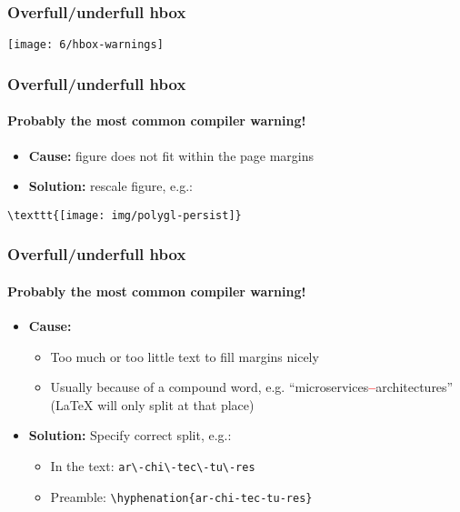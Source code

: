 \documentclass[aspectratio=169]{beamer}
\begin{document}
\begin{frame}
  \frametitle{Overfull/underfull hbox}

  \texttt{[image: 6/hbox-warnings]}

\end{frame}

\begin{frame}[fragile]
  \frametitle{Overfull/underfull hbox}
  \framesubtitle{Probably the most common compiler warning!}

  \begin{itemize}
    \item \textbf{Cause:} figure does not fit within the page margins
    \item \textbf{Solution:} rescale figure, e.g.:
  \end{itemize}

\begin{verbatim}
\texttt{[image: img/polygl-persist]}
\end{verbatim}

\end{frame}

\begin{frame}[fragile]
  \frametitle{Overfull/underfull hbox}
   \framesubtitle{Probably the most common compiler warning!}

  \begin{itemize}
   \item \textbf{Cause:}
   \begin{itemize}
       \item Too much or too little text to fill margins nicely
       \item Usually because of a compound word, e.g. ``microservices\textcolor{red}{\textbf{--}}architectures''
       ({\LaTeX} will only split at that place)
   \end{itemize}
   \item \textbf{Solution:} Specify correct split, e.g.:
   \begin{itemize}
       \item In the text: \verb|ar\-chi\-tec\-tu\-res|
       \item Preamble: \verb|\hyphenation{ar-chi-tec-tu-res}|
    \end{itemize}
  \end{itemize}

\end{frame}
\end{document}
